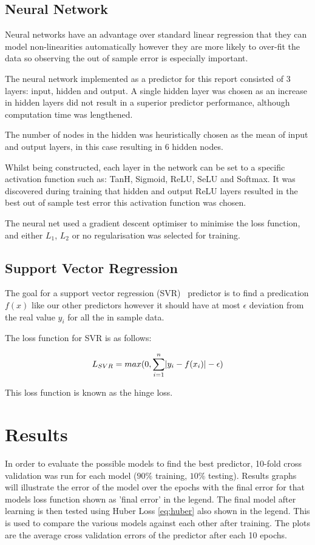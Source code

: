 \documentclass[10pt,twocolumn,letterpaper]{article}
\DeclarePairedDelimiter\abs{\lvert}{\rvert}%
\begin{document}
\subsection{Neural Network}
Neural networks have an advantage over standard linear regression that they can model non-linearities automatically however they are more likely to over-fit the data so observing the out of sample error is especially important.

The neural network implemented as a predictor for this report consisted of 3 layers: input, hidden and output. A single hidden layer was chosen as an increase in hidden layers did not result in a superior predictor performance, although computation time was lengthened.

The number of nodes in the hidden was heuristically chosen as the mean of input and output layers, in this case resulting in 6 hidden nodes.

Whilst being constructed, each layer in the network can be set to a specific activation function such as: TanH, Sigmoid, ReLU, SeLU and Softmax. It was discovered during training that hidden and output ReLU layers resulted in the best out of sample test error this activation function was chosen. 

The neural net used a gradient descent optimiser to minimise the loss function, and either $L_1$, $L_2$ or no regularisation was selected for training. 

\subsection{Support Vector Regression}


The goal for a support vector regression (SVR)~\cite{Cortes1995} predictor is to find a predication $f(x)$ like our other predictors however it should have at most $\epsilon$ deviation from the real value $y_i$ for all the in sample data.

The loss function for SVR is as follows:

\begin{equation}
L_{SVR} = max(0, \sum_{i = 1}^{n} \abs{y_i - f(x_i)} - \epsilon)
\label{eq:svr}
\end{equation}

This loss function is known as the hinge loss.

\section{Results}
In order to evaluate the possible models to find the best predictor, 10-fold cross validation was run for each model ($90\%$ training, $10\%$ testing). Results graphs will illustrate the error of the model over the epochs with the final error for that models loss function shown as 'final error' in the legend. The final model after learning is then tested using Huber Loss \ref{eq:huber} also shown in the legend. This is used to compare the various models against each other after training. The plots are the average cross validation errors of the predictor after each 10 epochs.
\end{document}
